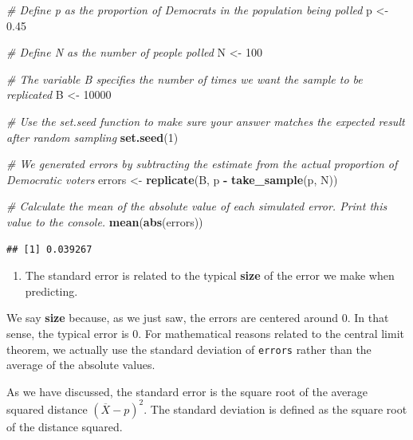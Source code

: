 \documentclass[
]{article}
\newenvironment{Shaded}{\begin{snugshade}}{\end{snugshade}}
\newcommand{\CommentTok}[1]{\textcolor[rgb]{0.56,0.35,0.01}{\textit{#1}}}
\newcommand{\DecValTok}[1]{\textcolor[rgb]{0.00,0.00,0.81}{#1}}
\newcommand{\FloatTok}[1]{\textcolor[rgb]{0.00,0.00,0.81}{#1}}
\newcommand{\KeywordTok}[1]{\textcolor[rgb]{0.13,0.29,0.53}{\textbf{#1}}}
\newcommand{\NormalTok}[1]{#1}
\newcommand{\OperatorTok}[1]{\textcolor[rgb]{0.81,0.36,0.00}{\textbf{#1}}}
\newcommand{\StringTok}[1]{\textcolor[rgb]{0.31,0.60,0.02}{#1}}
\providecommand{\tightlist}{%
  \setlength{\itemsep}{0pt}\setlength{\parskip}{0pt}}
\begin{document}
\begin{Shaded}
\begin{Highlighting}[]
\CommentTok{\# Define \textasciigrave{}p\textasciigrave{} as the proportion of Democrats in the population being polled}
\NormalTok{p \textless{}{-}}\StringTok{ }\FloatTok{0.45}

\CommentTok{\# Define \textasciigrave{}N\textasciigrave{} as the number of people polled}
\NormalTok{N \textless{}{-}}\StringTok{ }\DecValTok{100}

\CommentTok{\# The variable \textasciigrave{}B\textasciigrave{} specifies the number of times we want the sample to be replicated}
\NormalTok{B \textless{}{-}}\StringTok{ }\DecValTok{10000}

\CommentTok{\# Use the \textasciigrave{}set.seed\textasciigrave{} function to make sure your answer matches the expected result after random sampling}
\KeywordTok{set.seed}\NormalTok{(}\DecValTok{1}\NormalTok{)}

\CommentTok{\# We generated \textasciigrave{}errors\textasciigrave{} by subtracting the estimate from the actual proportion of Democratic voters}
\NormalTok{errors \textless{}{-}}\StringTok{ }\KeywordTok{replicate}\NormalTok{(B, p }\OperatorTok{{-}}\StringTok{ }\KeywordTok{take\_sample}\NormalTok{(p, N))}

\CommentTok{\# Calculate the mean of the absolute value of each simulated error. Print this value to the console.}
\KeywordTok{mean}\NormalTok{(}\KeywordTok{abs}\NormalTok{(errors))}
\end{Highlighting}
\end{Shaded}

\begin{verbatim}
## [1] 0.039267
\end{verbatim}

\begin{enumerate}
\def\labelenumi{\arabic{enumi}.}
\setcounter{enumi}{4}
\tightlist
\item
  The standard error is related to the typical \textbf{size} of the
  error we make when predicting.
\end{enumerate}

We say \textbf{size} because, as we just saw, the errors are centered
around 0. In that sense, the typical error is 0. For mathematical
reasons related to the central limit theorem, we actually use the
standard deviation of \texttt{errors} rather than the average of the
absolute values.

As we have discussed, the standard error is the square root of the
average squared distance \((\overline{X} - p)^2\). The standard
deviation is defined as the square root of the distance squared.
\end{document}
